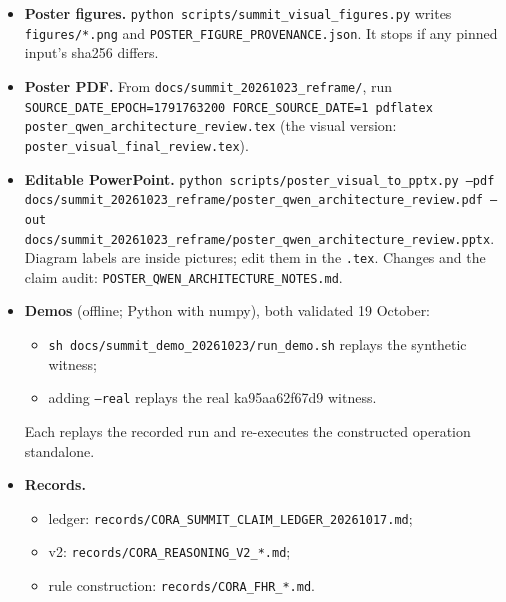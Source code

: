\documentclass[11pt]{article}
\newcommand{\sub}[1]{\par\needspace{6\baselineskip}\vspace{0.5em}{\large\bfseries\color{accent}#1}\par}
\begin{document}
\sub{Reproducing what you see}
\begin{itemize}
  \item \textbf{Poster figures.} \texttt{python scripts/summit\_visual\_figures.py} writes \texttt{figures/*.png} and
        \texttt{POSTER\_FIGURE\_PROVENANCE.json}. It stops if any pinned input's sha256 differs.
  \item \textbf{Poster PDF.} From \texttt{docs/summit\_20261023\_reframe/}, run \texttt{SOURCE\_DATE\_EPOCH=1791763200
        FORCE\_SOURCE\_DATE=1 pdflatex poster\_qwen\_architecture\_review.tex} (the visual version:
        \texttt{poster\_visual\_final\_review.tex}).
  \item \textbf{Editable PowerPoint.} \texttt{python scripts/poster\_visual\_to\_pptx.py --pdf
        docs/summit\_20261023\_reframe/poster\_qwen\_architecture\_review.pdf --out
        docs/summit\_20261023\_reframe/poster\_qwen\_architecture\_review.pptx}. Diagram labels are inside pictures; edit
        them in the \texttt{.tex}. Changes and the claim audit: \texttt{POSTER\_QWEN\_ARCHITECTURE\_NOTES.md}.
  \item \textbf{Demos} (offline; Python with numpy), both validated 19 October:
        \begin{itemize}
          \item \texttt{sh docs/summit\_demo\_20261023/run\_demo.sh} replays the synthetic witness;
          \item adding \texttt{--real} replays the real ka95aa62f67d9 witness.
        \end{itemize}
        Each replays the recorded run and re-executes the constructed operation standalone.
  \item \textbf{Records.}
        \begin{itemize}
          \item ledger: \texttt{records/CORA\_SUMMIT\_CLAIM\_LEDGER\_20261017.md};
          \item v2: \texttt{records/CORA\_REASONING\_V2\_*.md};
          \item rule construction: \texttt{records/CORA\_FHR\_*.md}.
        \end{itemize}
\end{itemize}
\end{document}
